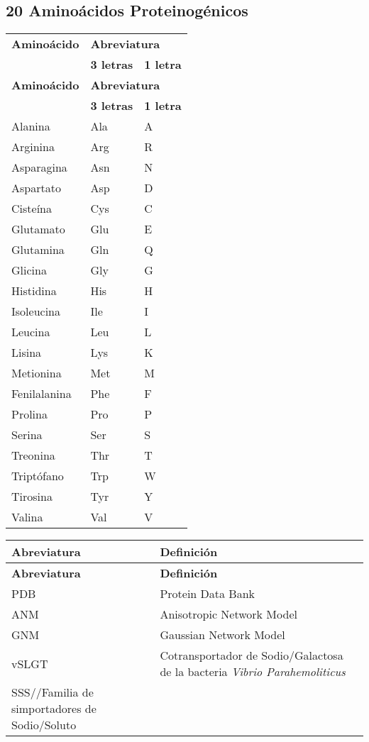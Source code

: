 \subsection*{20 Amino\'{a}cidos Proteinog\'{e}nicos} 
\begin{longtable}[l]{lll}
   \textbf{Amino\'{a}cido} & \multicolumn{2}{l}{\textbf{Abreviatura}} \\
  \cline{2-3}
  &\textbf{3 letras}&\textbf{1 letra}\\[0.5ex] \hline%
  \endfirsthead%
 \textbf{Amino\'{a}cido} & \multicolumn{2}{|l|}{\textbf{Abreviatura}} \\
  \cline{2-3}
  &\textbf{3 letras}&\textbf{1 letra}\\[0.5ex] \hline%
 \endhead%
\renewcommand{\arraystretch}{1.4}\label{amino}
Alanina&Ala&A\\
Arginina&Arg&R\\
Asparagina&Asn&N\\
Aspartato&Asp&D\\
Ciste\'{i}na&Cys&C\\
Glutamato&Glu&E\\
Glutamina&Gln&Q\\
Glicina&Gly&G\\
Histidina&His&H\\
Isoleucina&Ile&I\\
Leucina&Leu&L\\
Lisina&Lys&K\\
Metionina&Met&M\\
Fenilalanina&Phe&F\\
Prolina&Pro&P\\
Serina&Ser&S\\
Treonina&Thr&T\\
Tript\'{o}fano&Trp&W\\
Tirosina&Tyr&Y\\
Valina&Val&V\\ \hline
\end{longtable}
\begin{longtable}[l]{ll}\hline
   \textbf{Abreviatura} & \textbf{Definici\'{o}n} \\
 \hline%
  \endfirsthead%
 \textbf{Abreviatura} & \textbf{Definici\'{o}n} \\
  \hline%
 \endhead%
\renewcommand{\arraystretch}{1.4}\label{abre}
PDB&Protein Data Bank\\
ANM&Anisotropic Network Model\\
GNM&Gaussian Network Model\\
vSLGT&Cotransportador de Sodio/Galactosa de la bacteria \textit{Vibrio Parahemoliticus}\\
SSS//Familia de simportadores de Sodio/Soluto\\ \hline
\end{longtable}

\setlength{\extrarowheight}{0pt}